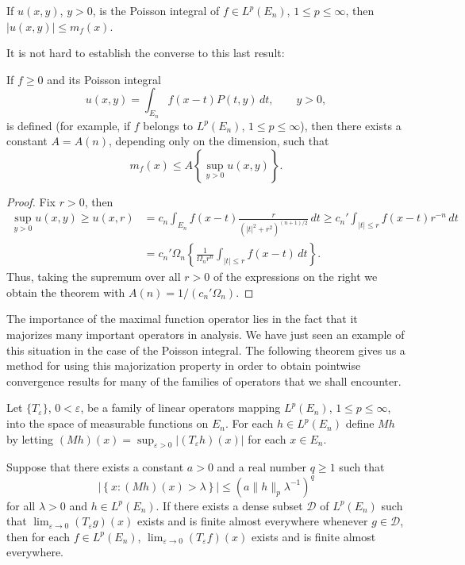 \begin{theorem}\label{thm:c2-3-10}
If $u(x, y)$, $y > 0$, is the Poisson integral of $f \in L^p(E_n)$, $1 \leq p \leq \infty$, then $|u(x, y)| \leq m_f(x)$.
\end{theorem}

It is not hard to establish the converse to this last result:

\begin{theorem}\label{thm:c2-3-11}
If $f \geq 0$ and its Poisson integral
\[
u(x, y) = \int_{E_n} f(x - t) P(t, y)\,dt, \qquad y > 0,
\]
is defined (for example, if $f$ belongs to $L^p(E_n)$, $1 \leq p \leq \infty$), then there exists a constant $A = A(n)$, depending only on the dimension, such that
\[
m_f(x) \leq A \left\{\sup_{y > 0} u(x, y)\right\}.
\]
\end{theorem}

\begin{proof}
Fix $r > 0$, then
\[
\begin{aligned}
\sup_{y > 0} u(x, y) \geq u(x, r) &= c_n \int_{E_n} f(x - t) \frac{r}{(|t|^2 + r^2)^{(n+1)/2}}\,dt
\geq c_n' \int_{|t| \leq r} f(x - t) r^{-n}\,dt \\
&= c_n' \Omega_n \left\{\frac{1}{\Omega_n r^n} \int_{|t| \leq r} f(x - t)\,dt\right\}.
\end{aligned}
\]
Thus, taking the supremum over all $r > 0$ of the expressions on the right we obtain the theorem with $A(n) = 1/(c_n' \Omega_n)$.
\end{proof}

The importance of the maximal function operator lies in the fact that it majorizes many important operators in analysis. We have just seen an example of this situation in the case of the Poisson integral. The following theorem gives us a method for using this majorization property in order to obtain pointwise convergence results for many of the families of operators that we shall encounter.

\begin{theorem}\label{thm:c2-3-12}
Let $\{T_\varepsilon\}$, $0 < \varepsilon$, be a family of linear operators mapping $L^p(E_n)$, $1 \leq p \leq \infty$, into the space of measurable functions on $E_n$. For each $h \in L^p(E_n)$ define $Mh$ by letting $(Mh)(x) = \sup_{\varepsilon > 0} |(T_\varepsilon h)(x)|$ for each $x \in E_n$.

Suppose that there exists a constant $a > 0$ and a real number $q \geq 1$ such that
\begin{equation}\label{eq:c2-3-13}
\left|\left\{x : (Mh)(x) > \lambda\right\}\right| \leq (a\|h\|_p \lambda^{-1})^q
\end{equation}
for all $\lambda > 0$ and $h \in L^p(E_n)$. If there exists a dense subset $\mathcal{D}$ of $L^p(E_n)$ such that $\lim_{\varepsilon \to 0} (T_\varepsilon g)(x)$ exists and is finite almost everywhere whenever $g \in \mathcal{D}$, then for each $f \in L^p(E_n)$, $\lim_{\varepsilon \to 0} (T_\varepsilon f)(x)$ exists and is finite almost everywhere.
\end{theorem}

